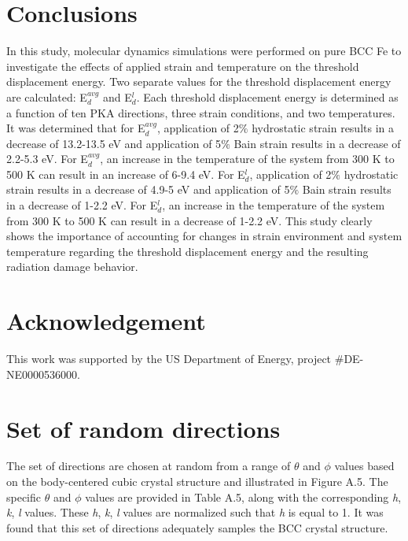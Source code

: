 \documentclass[review]{elsarticle}
\begin{document}
\section{Conclusions}
In this study, molecular dynamics simulations were performed on pure BCC Fe to investigate the effects of applied strain and temperature on the threshold displacement energy.  Two separate values for the threshold displacement energy are calculated: E$^{avg}_{d}$ and E$^{l}_{d}$.  Each threshold displacement energy is determined as a function of ten PKA directions, three strain conditions, and two temperatures.  It was determined that for E$^{avg}_{d}$, application of 2$\%$ hydrostatic strain results in a decrease of 13.2-13.5 eV and application of 5$\%$ Bain strain results in a decrease of 2.2-5.3 eV.  For E$^{avg}_{d}$, an increase in the temperature of the system from 300 K to 500 K can result in an increase of 6-9.4 eV.  For E$^{l}_{d}$, application of 2$\%$ hydrostatic strain results in a decrease of 4.9-5 eV and application of 5$\%$ Bain strain results in a decrease of 1-2.2 eV.  For E$^{l}_{d}$, an increase in the temperature of the system from 300 K to 500 K can result in a decrease of 1-2.2 eV.  This study clearly shows the importance of accounting for changes in strain environment and system temperature regarding the threshold displacement energy and the resulting radiation damage behavior.  

\section{Acknowledgement}
This work was supported by the US Department of Energy, project $\#$DE-NE0000536000.

\FloatBarrier

\appendix
\section{Set of random directions}

The set of directions are chosen at random from a range of $\theta$ and $\phi$ values based on the body-centered cubic crystal structure and illustrated in Figure A.5.  The specific $\theta$ and $\phi$ values are provided in Table A.5, along with the corresponding \textit{h}, \textit{k}, \textit{l} values.  These \textit{h}, \textit{k}, \textit{l} values are normalized such that \textit{h} is equal to 1.  It was found that this set of directions adequately samples the BCC crystal structure.
\end{document}

